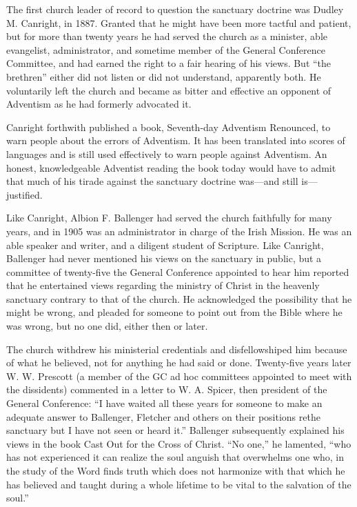 The first church leader of record to question the sanctuary doctrine was
Dudley M. Canright, in 1887. Granted that he might have been more tactful
and patient, but for more than twenty years he had served the church as a
minister, able evangelist, administrator, and sometime member of the General
Conference Committee, and had earned the right to a fair hearing of his
views. But ``the brethren'' either did not listen or did not understand,
apparently both. He voluntarily left the church and became as bitter and
effective an opponent of Adventism as he had formerly advocated it.

Canright forthwith published a book, Seventh-day Adventism Renounced, to
warn people about the errors of Adventism. It has been translated into
scores of languages and is still used effectively to warn people against
Adventism. An honest, knowledgeable Adventist reading the book today would
have to admit that much of his tirade against the sanctuary doctrine
was---and still is---justified.

Like Canright, Albion F. Ballenger had served the church faithfully for many
years, and in 1905 was an administrator in charge of the Irish Mission. He
was an able speaker and writer, and a diligent student of Scripture. Like 
Canright, Ballenger had never mentioned his views on the sanctuary in
public, but a committee of twenty-five the General Conference appointed to
hear him reported that he entertained views regarding the ministry of Christ
in the heavenly sanctuary contrary to that of the church. He acknowledged
the possibility that he might be wrong, and pleaded for someone to point out
from the Bible where he was wrong, but no one did, either then or later.

The church withdrew his ministerial credentials and disfellowshiped him
because of what he believed, not for anything he had said or done.
Twenty-five years later W. W. Prescott (a member of the GC ad hoc committees
appointed to meet with the dissidents) commented in a letter to W. A.
Spicer, then president of the General Conference: ``I have waited all these
years for someone to make an adequate answer to Ballenger, Fletcher and
others on their positions re\. the sanctuary but I have not seen or heard
it.'' Ballenger subsequently explained his views in the book Cast Out for the
Cross of Christ. ``No one,'' he lamented, ``who has not experienced it can
realize the soul anguish that overwhelms one who, in the study of the Word
finds truth which does not harmonize with that which he has believed and
taught during a whole lifetime to be vital to the salvation of the soul.''\cite{21, 20a}

